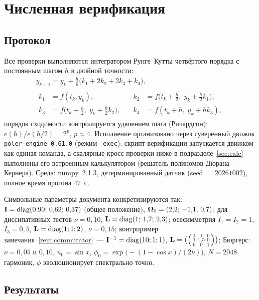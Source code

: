 \needspace{0.25\textheight}
\section{Численная верификация}\label{sec:numerics}

\subsection{Протокол}

Все проверки выполняются интегратором Рунге--Кутты четвёртого порядка
с постоянным шагом $h$ в двойной точности:
\begin{gather*}
  y_{k+1} = y_k + \frac{h}{6}\bigl(k_1 + 2k_2 + 2k_3 + k_4\bigr),\\
  \begin{aligned}
    k_1 &= f(t_k, y_k), &\quad k_2 &= f\bigl(t_k + \tfrac h2,\; y_k + \tfrac h2 k_1\bigr),\\
    k_3 &= f\bigl(t_k + \tfrac h2,\; y_k + \tfrac h2 k_2\bigr), &\quad k_4 &= f(t_k + h,\; y_k + h k_3),
  \end{aligned}
\end{gather*}
порядок сходимости контролируется удвоением шага (Ричардсон):
$e(h)/e(h/2) = 2^{p}$, $p \approx 4$. Исполнение организовано через
суверенный движок \texttt{poler-engine~0.61.0} (режим
\texttt{--exec}): скрипт верификации запускается движком как единая
команда, а скалярные кросс-проверки ниже в подразделе~\ref{sec:calc}
выполнены его встроенным калькулятором (решатель полиномов
Дюрана--Кернера). Среда: numpy~2.1.3, детерминированный датчик
(seed $= 20261002$), полное время прогона $47$~с.

Символьные параметры документа конкретизируются так:
$\mathbf{I} = \operatorname{diag}(0{,}90;\,0{,}62;\,0{,}37)$ (общее положение),
$\boldsymbol{\Omega}_0 = (2{,}2;\,-1{,}1;\,0{,}7)$; для диссипативных тестов
$\nu = 0{,}10$, $\mathbf{L} = \operatorname{diag}(1;\,1{,}7;\,2{,}3)$; осесимметрия
$I_1 = I_2 = 1$, $I_3 = 0{,}5$, $\mathbf{L} = \operatorname{diag}(1;1;2)$, $\nu = 0{,}15$;
контрпример замечания~\ref{rem:commutator}~---
$\mathbf{I}^{-1} = \operatorname{diag}(10;1;1)$,
$\mathbf{L} = \bigl(\begin{psmallmatrix}1&1&0\\1&1{,}5&0\\0&0&1\end{psmallmatrix}\bigr)$;
Бюргерс: $\nu = 0{,}05$ и $0{,}10$, $u_0 = \sin x$,
$\phi_0 = \exp\bigl(-(1-\cos x)/(2\nu)\bigr)$, $N = 2048$ гармоник,
$\phi$ эволюционирует спектрально точно.

\subsection{Результаты}

